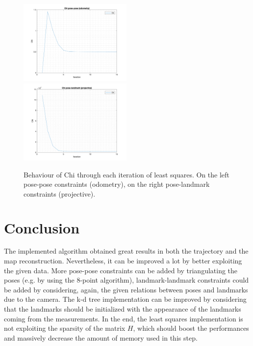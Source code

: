 \documentclass[11pt]{extarticle}
\begin{document}
\begin{figure}
    \centering
    \includegraphics[width=0.495\textwidth]{matlab/chi-pose-pose-odom.png}
    \includegraphics[width=0.495\textwidth]{matlab/chi-pose-landmark-proj.png}
    \caption{Behaviour of Chi through each iteration of least squares. On
        the left pose-pose constraints (odometry), on the right pose-landmark
        constraints (projective).}
    \label{fig:chi}
\end{figure}

\section{Conclusion}
The implemented algorithm obtained great results in both the trajectory and
the map reconstruction. Nevertheless, it can be improved a lot by better
exploiting the given data. More pose-pose constraints can be added by
triangulating the poses (e.g. by using the 8-point algorithm), landmark-landmark
constraints could be added by considering, again, the given relations between
poses and landmarks due to the camera. The k-d tree implementation can be
improved by considering that the landmarks should be initialized with the
appearance of the landmarks coming from the measurements. In the end, the
least squares implementation is not exploiting the sparsity of the matrix $H$,
which should boost the performances and massively decrease the amount of memory
used in this step.

\clearpage


\end{document}
